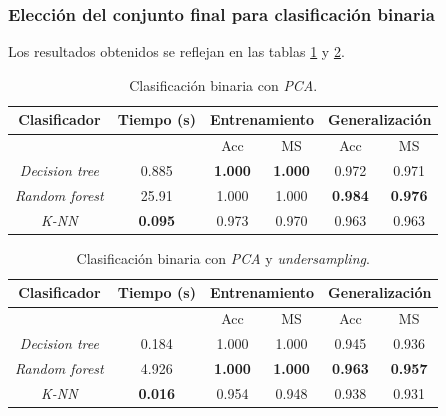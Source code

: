 \newpage
\subsubsection{Elección del conjunto final para clasificación binaria}
\label{subsubsec:eleccion_dataset_bin}

Los resultados obtenidos se reflejan en las tablas \ref{tabla:binary_pca} y \ref{tabla:binary_under}.

\begin{table}[th]
	\centering
	\begin{tabular}{ |c|c|c|c|c|c| }
		\hline
		\rowcolor{LightCyan}
		Clasificador & Tiempo (s) & \multicolumn{2}{c|}{Entrenamiento} & \multicolumn{2}{c|}{Generalización} \\
		\hline
		\rowcolor{LightCyan}
		&            & Acc & MS  & Acc & MS  \\
		\hline
		\textit{Decision tree}  & 0.885          & \textbf{1.000} & \textbf{1.000} & 0.972          & 0.971          \\
		\textit{Random forest}  & 25.91          & 1.000          & 1.000          & \textbf{0.984} & \textbf{0.976} \\
		\textit{K-NN}           & \textbf{0.095} & 0.973          & 0.970          & 0.963          & 0.963          \\
		\hline
	\end{tabular}
	\caption{Clasificación binaria con \textit{PCA}.}
	\label{tabla:binary_pca}
\end{table}

\begin{table}[th]
	\centering
	\begin{tabular}{ |c|c|c|c|c|c| }
		\hline
		\rowcolor{LightCyan}
		Clasificador & Tiempo (s) & \multicolumn{2}{c|}{Entrenamiento} & \multicolumn{2}{c|}{Generalización} \\
		\hline
		\rowcolor{LightCyan}
		&            & Acc & MS & Acc & MS \\
		\hline
		\textit{Decision tree}  & 0.184          & 1.000          & 1.000          & 0.945          & 0.936          \\
		\textit{Random forest}  & 4.926          & \textbf{1.000} & \textbf{1.000} & \textbf{0.963} & \textbf{0.957} \\
		\textit{K-NN}           & \textbf{0.016} & 0.954          & 0.948          & 0.938          & 0.931          \\
		\hline
	\end{tabular}
	\caption{Clasificación binaria con \textit{PCA} y \textit{undersampling}.}
	\label{tabla:binary_under}
\end{table}

